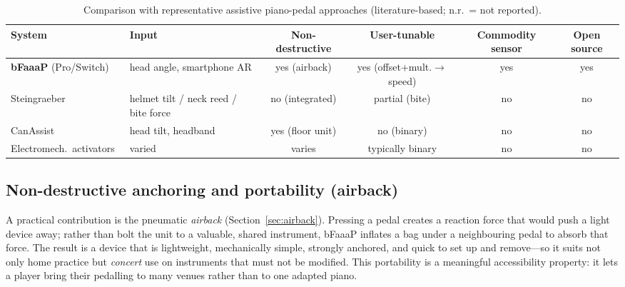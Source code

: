 \begin{table}[tbp]
\caption{Comparison with representative assistive piano-pedal approaches
(literature-based; n.r.\ = not reported).}
\label{tab:comparison}
\small
\begin{tabular}{@{}p{2.9cm}p{2.7cm}cccc@{}}
\toprule
System & Input & Non-destructive & User-tunable & Commodity sensor & Open source \\
\midrule
\textbf{bFaaaP} (Pro/Switch) & head angle, smartphone AR & yes (airback) & yes (offset+mult.$\rightarrow$speed) & yes & yes \\
Steingraeber~\cite{steingraeber,mouthpedal2008} & helmet tilt / neck reed / bite force & no (integrated) & partial (bite) & no & no \\
CanAssist~\cite{canassist} & head tilt, headband & yes (floor unit) & no (binary) & no & no \\
Electromech.\ activators~\cite{hinsley1988,uspedal2008,uspedal2017} & varied & varies & typically binary & no & no \\
\bottomrule
\end{tabular}
\end{table}

\subsection{Non-destructive anchoring and portability (airback)}
A practical contribution is the pneumatic \emph{airback}
(Section~\ref{sec:airback}). Pressing a pedal creates a reaction force that would
push a light device away; rather than bolt the unit to a valuable, shared
instrument, bFaaaP inflates a bag under a neighbouring pedal to absorb that force.
The result is a device that is lightweight, mechanically simple, strongly anchored,
and quick to set up and remove---so it suits not only home practice but
\emph{concert} use on instruments that must not be modified. This portability is a
meaningful accessibility property: it lets a player bring their pedalling to many
venues rather than to one adapted piano.

